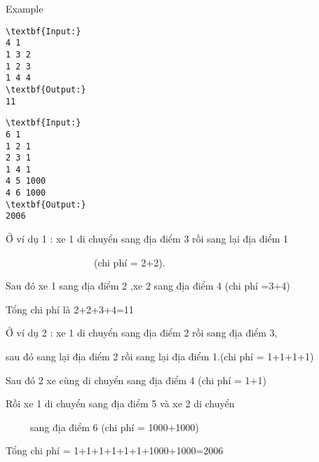 Example
\begin{verbatim}
\textbf{Input:} 
4 1
1 3 2
1 2 3
1 4 4
\textbf{Output:}
11
\end{verbatim}
\begin{verbatim}
\textbf{Input:} 
6 1
1 2 1
2 3 1
1 4 1
4 5 1000
4 6 1000
\textbf{Output:}
2006\end{verbatim}







Ở ví dụ 1 : xe 1 di chuyển sang địa điểm 3 rồi sang lại địa điểm 1


                  (chi phí = 2+2).


Sau đó xe 1 sang địa điểm 2 ,xe 2 sang địa điểm 4 (chi phí =3+4)


Tổng chi phí là 2+2+3+4=11


Ở ví dụ 2 : xe 1 di chuyển sang địa điểm 2 rồi sang địa điểm 3,


sau đó sang lại địa điểm 2 rồi sang lại địa điểm 1.(chi phí = 1+1+1+1)


Sau đó 2 xe cùng di chuyển sang địa điểm 4 (chi phí = 1+1)


Rồi xe 1 di chuyển sang địa điểm 5 và xe 2 di chuyển


     sang địa điểm 6 (chi phí = 1000+1000)


Tổng chi phí = 1+1+1+1+1+1+1000+1000=2006